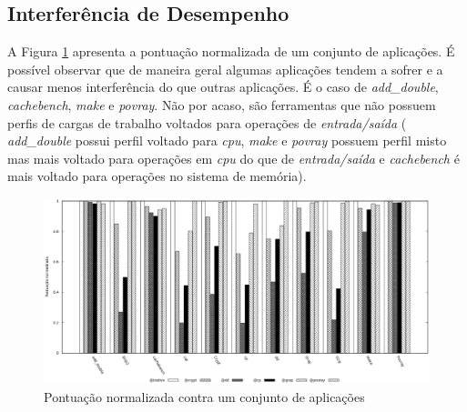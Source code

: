 \documentclass[[10pt,journal]{IEEEtran}
\begin{document}
\subsection{Interferência de Desempenho}
\label{sec:exp2}
A Figura \ref{second_experiment} apresenta a pontuação normalizada de um conjunto de aplicações. É possível observar que de maneira geral algumas aplicações tendem a sofrer e a causar menos interferência do que outras aplicações. É o caso de \textit{add\_double}, \textit{cachebench}, \textit{make} e \textit{povray}. Não por acaso, são ferramentas que não possuem perfis de cargas de trabalho voltados para operações de \textit{entrada/saída} ( \textit{add\_double} possui perfil voltado para \textit{cpu}, \textit{make} e \textit{povray} possuem perfil misto mas mais voltado para operações em \textit{cpu} do que de \textit{entrada/saída} e \textit{cachebench} é mais voltado para operações no sistema de memória).

\begin{figure}[!h]
\centering
\includegraphics [keepaspectratio=true,scale=0.3]{graficos/exp_2_foreground.eps}
\caption{Pontuação normalizada contra um conjunto de aplicações}
\label{second_experiment}
\end{figure} 

 
\end{document}
